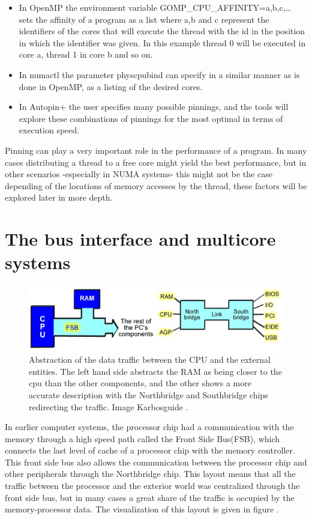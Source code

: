 \begin{itemize}
	\item In OpenMP the environment variable GOMP\_CPU\_AFFINITY=a,b,c,… sets the affinity of a program as a list where a,b and c represent the identifiers of the cores that will execute the thread with the id in the position in which the identifier was given. In this example thread 0 will be executed in core a, thread 1 in core b and so on.
	\item In numactl the parameter physcpubind can specify in a similar manner as is done in OpenMP, as a listing of the desired cores.
	\item In Autopin+ the user specifies many possible pinnings, and the tools will explore these combinations of pinnings for the most optimal in terms of execution speed.
\end{itemize}
Pinning can play a very important role in the performance of a program. In many cases distributing a thread to a free core might yield the best performance, but in other scenarios -especially in NUMA systems- this might not be the case depending of the locations of memory accesses by the thread, these factors will be explored later in more depth. 

\section{The bus interface and multicore systems}\label{section:businterface}
\begin{figure}
	\centering
		\includegraphics[width=.9\textwidth]{figures/bus-abstraction.eps}
		\caption[bus-abtraction]{Abstraction of the data traffic between the CPU and the external entities. The left hand side abstracts the RAM as being closer to the cpu than the other components, and the other shows a more accurate description with the Northbridge and Southbridge chips redirecting the traffic. Image Karbosguide \cite{pcarch-carbo}. }
		\label{fig:bus-abs}
\end{figure}

In earlier computer systems, the processor chip had a communication with the memory through a high speed path called the Front Side Bus(FSB), which connects the last level of cache of a processor chip with the memory controller. This front side bus also allows the communication between the processor chip and other peripherals through the Northbridge chip. This layout means that all the traffic between the processor and the exterior world was centralized through the front side bus, but in many cases a great share of the traffic is occupied by the memory-processor data. The visualization of this layout is given in figure \cite{fig:pcarch-carbo}. 

